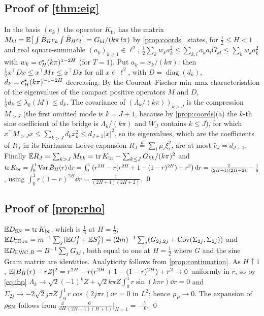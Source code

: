 \subsection{Proof of \texorpdfstring{\cref{thm:eig}}{Theorem 3}}
In the basis $(e_k)$ the operator $K_{\mathrm{br}}$ has the matrix $M_{kl}=\mathbb E\big[\int\tilde B_H e_k\int\tilde B_H e_l\big]=G_{kl}/(k\pi\,l\pi)$
by \cref{prop:coords}.  states, for $\frac12\le H<1$ and real square-summable
$(a_k)_{k\ge1}\in\ell^2$, $\frac12\sum_kw_ka_k^2\le\sum_{k,l}a_ka_lG_{kl}\le\sum_kw_ka_k^2$ with $w_k=c^{\star}_H(k\pi)^{1-2H}$ (for $T=1$). Put
$a_k=x_k/(k\pi)$: then $\frac12x^\top Dx\le x^\top Mx\le x^\top Dx$ for all $x\in\ell^2$, with
$D=\operatorname{diag}(d_k)$, $d_k=c^{\star}_H(k\pi)^{-1-2H}$ decreasing. By the Courant--Fischer min--max characterisation of the
eigenvalues of the compact positive operators $M$ and $D$, $\frac12d_k\le\lambda_k(M)\le d_k$. The covariance of
$(\Lambda_k/(k\pi))_{k>J}$ is the compression $M_{>J}$ (the first omitted mode is $k=J+1$, because by
\cref{prop:coords}(a) the $k$-th sine coefficient of the bridge is $\Lambda_k/(k\pi)$ and $W_J$ contains $k\le J$), for which $x^\top M_{>J}x\le\sum_{k>J}d_kx_k^2\le d_{J+1}|x|^2$, so
its eigenvalues, which are the coefficients of $R_J$ in its Karhunen--Lo\`eve expansion $R_J\overset d=\sum_i\mu_i\xi_i^2$,
are at most $\bar c_J=d_{J+1}$. Finally $\mathbb E R_J=\sum_{k>J}M_{kk}=\operatorname{tr} K_{\mathrm{br}}-\sum_{k\le J}G_{kk}/(k\pi)^2$ and
$\operatorname{tr} K_{\mathrm{br}}=\int_0^1\operatorname{Var}\tilde B_H(r)\,\mathrm d r=\int_0^1\big(r^{2H}-r(r^{2H}+1-(1-r)^{2H})+r^2\big)\,\mathrm d r
=\frac2{(2H+1)(2H+2)}-\frac16$, using $\int_0^1r(1-r)^{2H}\dd r=\frac1{(2H+1)(2H+2)}$. \qed

\subsection{Proof of \texorpdfstring{\cref{prop:rho}}{the first-moment proposition}}
$\mathbb E D_{\mathrm{SN}}=\operatorname{tr} K_{\mathrm{br}}$, which is $\frac16$ at $H=\frac12$; $\mathbb E D_{\mathrm{HI},m}=m^{-1}\sum_j(\mathbb E C_j^2+\mathbb E S_j^2)
=(2m)^{-1}\sum_j(G_{2j,2j}+\operatorname{Cov}(\Sigma_{2j},\Sigma_{2j}))$ and $\mathbb E D_{\mathrm{EWC},B}=B^{-1}\sum_jG_{jj}$, both equal to one at
$H=\frac12$ where $G$ and the sine Gram matrix are identities. Analyticity follows from \cref{prop:continuation}. As
$H\uparrow1$, $\mathbb E|B_H(r)-rZ|^2=r^{2H}-r(r^{2H}+1-(1-r)^{2H})+r^2\to0$ uniformly in $r$, so by \eqref{eq:ibp}
$\Lambda_k\to\sqrt2(-1)^kZ+\sqrt2k\pi Z\int_0^1r\sin(k\pi r)\dd r=0$ and
$\Sigma_{2j}\to-2\sqrt2j\pi Z\int_0^1r\cos(2j\pi r)\dd r=0$ in $L^2$; hence $\rho_P\to0$. The expansion of $\rho_{\mathrm{SN}}$
follows from $\frac{\dd}{\dd H}\frac6{(2H+1)(H+1)}\big|_{H=1}=-\frac76$. \qed


